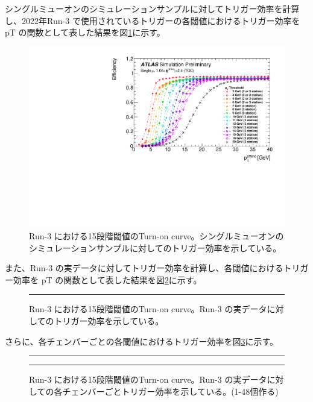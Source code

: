 シングルミューオンのシミュレーションサンプルに対してトリガー効率を計算し、2022年Run-3 で使用されているトリガーの各閾値におけるトリガー効率を pT の関数として表した結果を図\ref{fig:Run3_15_MC}に示す。

\begin{figure}[tb]
  \centering
  \includegraphics[clip, width=15cm]{fig/3/PLOT-TRIG-2020-01-fig1.pdf}
  \caption{Run-3 における15段階閾値のTurn-on curve。シングルミューオンのシミュレーションサンプルに対してのトリガー効率を示している。}
  \label{fig:Run3_15_MC}
\end{figure}

また、Run-3 の実データに対してトリガー効率を計算し、各閾値におけるトリガー効率を pT の関数として表した結果を図\ref{fig:Run3_15_Data}に示す。

\begin{figure}[tb]
  \centering
  \rule{8cm}{6cm}
  \caption{Run-3 における15段階閾値のTurn-on curve。Run-3 の実データに対してのトリガー効率を示している。}
  \label{fig:Run3_15_Data}
\end{figure}

さらに、各チェンバーごとの各閾値におけるトリガー効率を図\ref{fig:Run3_15_Data_chamber1}に示す。

\begin{figure}
    \centering
    \begin{minipage}[b]{0.4\linewidth}
        \centering
        \rule{6cm}{4cm}
        \vspace{10pt}
        \subcaption{}
        \label{}
    \end{minipage}
    \hfill
    \begin{minipage}[b]{0.4\linewidth}
        \centering
        \rule{6cm}{4cm}
        \vspace{10pt}
        \subcaption{}
        \label{}
    \end{minipage}
    \caption{Run-3 における15段階閾値のTurn-on curve。Run-3 の実データに対しての各チェンバーごとトリガー効率を示している。(1-48個作る)}
    \label{fig:Run3_15_Data_chamber1}
\end{figure}

